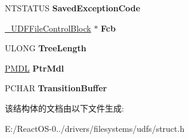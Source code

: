 \begin{DoxyCompactItemize}
N\+T\+S\+T\+A\+T\+US {\bfseries Saved\+Exception\+Code}
\item 
\mbox{\label{struct___u_d_f_irp_context_a152bc15811be56a99fa10efb046c8b44}} 
\hyperlink{struct___u_d_f_file_control_block}{\+\_\+\+U\+D\+F\+File\+Control\+Block} $\ast$ {\bfseries Fcb}
\item 
\mbox{\label{struct___u_d_f_irp_context_ab0e8b403304dcccbaa3bf72fd200ff89}} 
U\+L\+O\+NG {\bfseries Tree\+Length}
\item 
\mbox{\label{struct___u_d_f_irp_context_a01b5ee02ee159a091567f2913cece387}} 
\hyperlink{interfacevoid}{P\+M\+DL} {\bfseries Ptr\+Mdl}
\item 
\mbox{\label{struct___u_d_f_irp_context_a9bcc3db2d1fb2481eecb3005c68b761c}} 
P\+C\+H\+AR {\bfseries Transition\+Buffer}
\end{DoxyCompactItemize}


该结构体的文档由以下文件生成\+:\begin{DoxyCompactItemize}
\item 
E\+:/\+React\+O\+S-\/0../drivers/filesystems/udfs/struct.\+h\end{DoxyCompactItemize}
